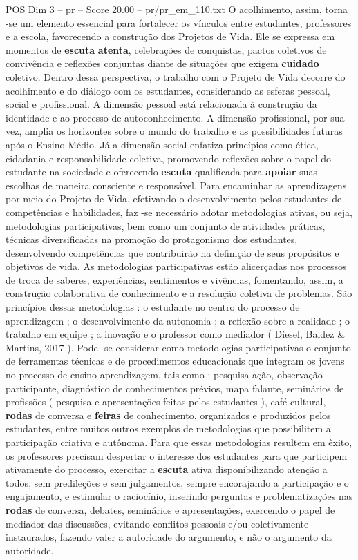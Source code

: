 \begin{textsample}{POS Dim 3 – pr – Score 20.00 – pr/pr\_em\_110.txt}
O acolhimento, assim, torna -se um elemento essencial para fortalecer os vínculos entre estudantes, professores e a escola, favorecendo a construção dos Projetos de Vida.
Ele se expressa em momentos de \textbf{escuta} \textbf{atenta}, celebrações de conquistas, pactos coletivos de convivência e reflexões conjuntas diante de situações que exigem \textbf{cuidado} coletivo.
Dentro dessa perspectiva, o trabalho com o Projeto de Vida decorre do acolhimento e do diálogo com os estudantes, considerando as esferas pessoal, social e profissional.
A dimensão pessoal está relacionada à construção da identidade e ao processo de autoconhecimento.
A dimensão profissional, por sua vez, amplia os horizontes sobre o mundo do trabalho e as possibilidades futuras após o Ensino Médio.
Já a dimensão social enfatiza princípios como ética, cidadania e responsabilidade coletiva, promovendo reflexões sobre o papel do estudante na sociedade e oferecendo \textbf{escuta} qualificada para \textbf{apoiar} suas escolhas de maneira consciente e responsável.
Para encaminhar as aprendizagens por meio do Projeto de Vida, efetivando o desenvolvimento pelos estudantes de competências e habilidades, faz -se necessário adotar metodologias ativas, ou seja, metodologias participativas, bem como um conjunto de atividades práticas, técnicas diversificadas na promoção do protagonismo dos estudantes, desenvolvendo competências que contribuirão na definição de seus propósitos e objetivos de vida.
As metodologias participativas estão alicerçadas nos processos de troca de saberes, experiências, sentimentos e vivências, fomentando, assim, a construção colaborativa de conhecimento e a resolução coletiva de problemas.
São princípios dessas metodologias : o estudante no centro do processo de aprendizagem ; o desenvolvimento da autonomia ; a reflexão sobre a realidade ; o trabalho em equipe ; a inovação e o professor como mediador ( Diesel, Baldez \& Martins, 2017 ).
Pode -se considerar como metodologias participativas o conjunto de ferramentas técnicas e de procedimentos educacionais que integram os jovens no processo de ensino-aprendizagem, tais como : pesquisa-ação, observação participante, diagnóstico de conhecimentos prévios, mapa falante, seminários de profissões ( pesquisa e apresentações feitas pelos estudantes ), café cultural, \textbf{rodas} de conversa e \textbf{feiras} de conhecimento, organizados e produzidos pelos estudantes, entre muitos outros exemplos de metodologias que possibilitem a participação criativa e autônoma.
Para que essas metodologias resultem em êxito, os professores precisam despertar o interesse dos estudantes para que participem ativamente do processo, exercitar a \textbf{escuta} ativa disponibilizando atenção a todos, sem predileções e sem julgamentos, sempre encorajando a participação e o engajamento, e estimular o raciocínio, inserindo perguntas e problematizações nas \textbf{rodas} de conversa, debates, seminários e apresentações, exercendo o papel de mediador das discussões, evitando conflitos pessoais e/ou coletivamente instaurados, fazendo valer a autoridade do argumento, e não o argumento da autoridade.

\end{textsample}
